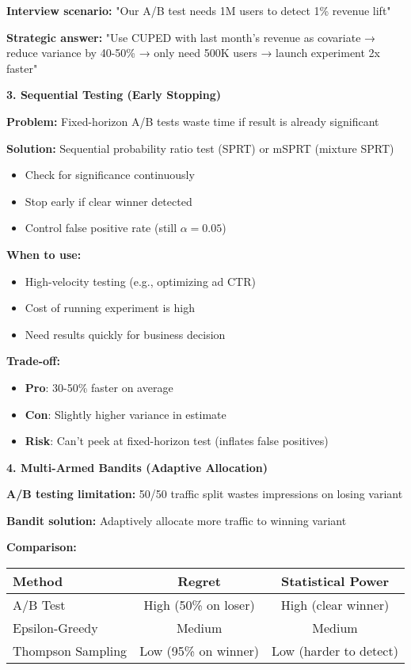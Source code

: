 \documentclass[10pt]{article}
\begin{document}
\textbf{Interview scenario:} "Our A/B test needs 1M users to detect 1\% revenue lift"

\textbf{Strategic answer:} "Use CUPED with last month's revenue as covariate → reduce variance by 40-50\% → only need 500K users → launch experiment 2x faster"

\textbf{3. Sequential Testing (Early Stopping)}

\textbf{Problem:} Fixed-horizon A/B tests waste time if result is already significant

\textbf{Solution:} Sequential probability ratio test (SPRT) or mSPRT (mixture SPRT)
\begin{itemize}
\item Check for significance continuously
\item Stop early if clear winner detected
\item Control false positive rate (still $\alpha = 0.05$)
\end{itemize}

\textbf{When to use:}
\begin{itemize}
\item High-velocity testing (e.g., optimizing ad CTR)
\item Cost of running experiment is high
\item Need results quickly for business decision
\end{itemize}

\textbf{Trade-off:}
\begin{itemize}
\item \textbf{Pro}: 30-50\% faster on average
\item \textbf{Con}: Slightly higher variance in estimate
\item \textbf{Risk}: Can't peek at fixed-horizon test (inflates false positives)
\end{itemize}

\textbf{4. Multi-Armed Bandits (Adaptive Allocation)}

\textbf{A/B testing limitation:} 50/50 traffic split wastes impressions on losing variant

\textbf{Bandit solution:} Adaptively allocate more traffic to winning variant

\textbf{Comparison:}

\begin{tabular}{|l|c|c|}
\hline
\textbf{Method} & \textbf{Regret} & \textbf{Statistical Power} \\
\hline
A/B Test & High (50\% on loser) & High (clear winner) \\
Epsilon-Greedy & Medium & Medium \\
Thompson Sampling & Low (95\% on winner) & Low (harder to detect) \\
\hline
\end{tabular}
\end{document}
